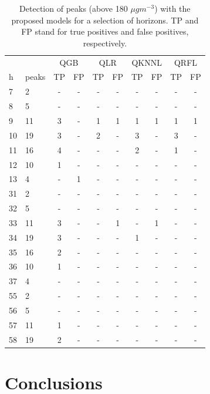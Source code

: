 \documentclass[a4paper,twocolumn,5p]{elsarticle}
\begin{document}
\begin{table}[tbp]
  \centering
  \caption{\label{table:classif_hig}
    Detection of \no peaks (above 180 $\mu gm^{-3}$) with the proposed
    models for a selection of horizons. TP and FP stand for true
    positives and false positives, respectively.
  }
  \begin{tabular}{llcccccccc}
    \toprule 
    \multicolumn{2}{c}{} & \multicolumn{2}{c}{QGB} & \multicolumn{2}{c}{QLR} & \multicolumn{2}{c}{QKNNL} & \multicolumn{2}{c}{QRFL}   \\
    h & peaks &  TP &  FP &  TP &  FP &  TP &  FP &  TP &  FP\\
    \midrule
    7  & 2 &- &   - &- &   - &- & - &- &- \\
    8  & 5 &- &   - &- &   - &- & - &- &- \\
    9  &11 &3 &   - &1 &   1 &1 & 1 &1 &1 \\
    10 &19 &3 &   - &2 &   - &3 & - &3 &- \\
    11 &16 &4 &   - &- &   - &2 & - &1 &- \\
    12 &10 &1 &   - &- &   - &- & - &- &- \\
    13 & 4 &- &   1 &- &   - &- & - &- &- \\
    31 & 2 &- &   - &- &   - &- & - &- &- \\
    32 & 5 &- &   - &- &   - &- & - &- &- \\
    33 &11 &3 &   - &- &   1 &- & 1 &- &- \\
    34 &19 &3 &   - &- &   - &1 & - &- &- \\
    35 &16 &2 &   - &- &   - &- & - &- &- \\
    36 &10 &1 &   - &- &   - &- & - &- &- \\
    37 & 4 &- &   - &- &   - &- & - &- &- \\
    55 & 2 &- &   - &- &   - &- & - &- &- \\
    56 & 5 &- &   - &- &   - &- & - &- &- \\
    57 &11 &1 &   - &- &   - &- & - &- &- \\
    58 &19 &2 &   - &- &   - &- & - &- &- \\
    \bottomrule
    \end{tabular}
\end{table}

\section{Conclusions}
\label{sec:concl}
\end{document}
